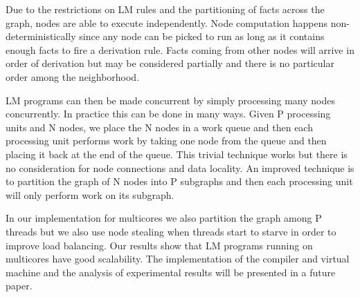 Due to the restrictions on LM rules and the partitioning of facts across the graph, nodes are able to
execute independently. Node computation happens non-deterministically since any node can be picked to run as long as it
contains enough facts to fire a derivation rule. Facts coming from other nodes will arrive in order of derivation but may be considered
partially and there is no particular order among the neighborhood.

LM programs can then be made concurrent by simply processing many nodes concurrently. In practice this can be done in many ways.
Given P processing units and N nodes, we place the N nodes in a work queue and then each processing unit performs work by taking
one node from the queue and then placing it back at the end of the queue. This trivial technique works but there is no consideration
for node connections and data locality. An improved technique is to partition the graph of N nodes into P subgraphs and then each
processing unit will only perform work on its subgraph.

In our implementation for multicores we also partition the graph among P threads but we also use node stealing when threads start to starve
in order to improve load balancing.
Our results show that LM programs running on multicores have good scalability. The implementation of the compiler and virtual machine and
the analysis of experimental results will be presented in a future paper.
